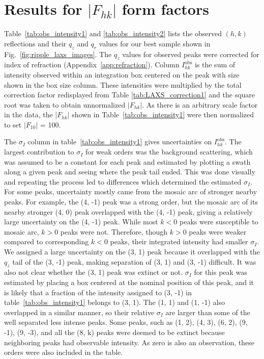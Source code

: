 \newpage
\section{Results for $|F_{hk}|$ form factors}\label{sec:LAXS_form_factors}

Table~\ref{tab:obs_intensity1} and \ref{tab:obs_intensity2} lists the observed 
$(h,k)$ reflections and their $q_z$ and $q_r$ values for our best sample shown 
in Fig.~\ref{fig:ripple_laxs_images}. The $q_z$ values 
for observed peaks were corrected for index of refraction (Appendix~\ref{app:refraction}).
Column $I^\text{obs}_{hk}$ is the sum of intensity observed within an
integration box centered on the peak with size shown in the box size column.  
These intensities were multiplied by the total correction factor redisplayed 
from Table \ref{tab:LAXS_correction1} and the square root was taken to obtain 
unnormalized  $|F_{hk}|$.  
As there is an arbitrary scale factor in the data, the $|F_{hk}|$ shown in 
Table~\ref{tab:obs_intensity1} were then normalized to set $|F_{10}|$ = 100.

The $\sigma_I$ column in table~\ref{tab:obs_intensity1} gives uncertainties on 
$I^\text{obs}_{hk}$.
The largest contribution to $\sigma_I$ for weak orders was the background 
scattering, which
was assumed to be a constant for each peak and 
estimated by plotting a swath along a given peak 
and seeing where the peak tail ended. This was done visually and repeating 
the process led to differences which determined the estimated $\sigma_I$.  
For some peaks, uncertainty mostly came 
from the mosaic arc of stronger nearby peaks. For example, the (4, -1) peak was a
strong order, but the mosaic arc of its nearby stronger (4, 0) peak  
overlapped with the (4, -1) peak, giving a relatively large uncertainty
on the (4, -1) peak. While most $k<0$ peaks were susceptible to
mosaic arc, $k > 0$ peaks were not. Therefore, though $k> 0$ peaks were weaker
compared to corresponding $k < 0$ peaks, their integrated intensity
had smaller $\sigma_I$. We assigned a large uncertainty on the (3, 1) peak because
it overlapped with the $q_z$ tail of the (3, -1) peak, making separation of 
(3, 1) and (3, -1) difficult. It was also not clear whether the (3, 1) peak
was extinct or not. $\sigma_I$ for this peak was estimated by placing a
box centered at the nominal position of this peak, and it is likely that a fraction
of the intensity assigned to (3, -1) in table~\ref{tab:obs_intensity1} belongs to (3, 1).
The (1, 1) and (1, -1) also overlapped in a similar manner, so their
relative $\sigma_I$ are larger than some of the well separated less intense peaks.  
Some peaks, such as (1, 2), (4, 3), (6, 2), (9, -1), (9, -3), and all the 
(8, k) peaks were deemed to be extinct because neighboring peaks had 
observable intensity. As zero is also an observation, these orders were also 
included in the table. 


